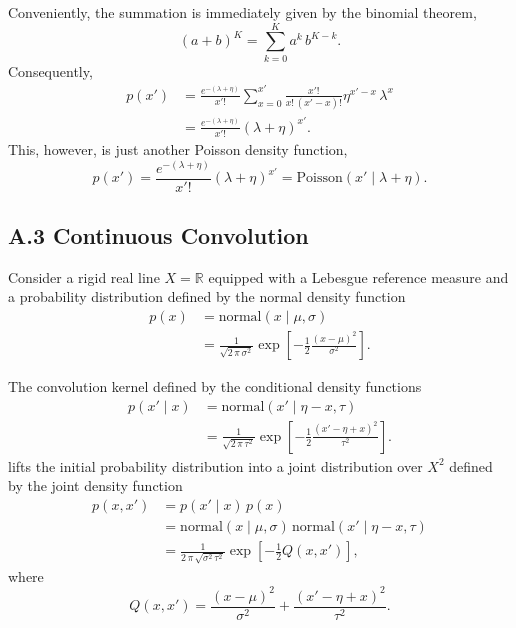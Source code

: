 \documentclass[
  letterpaper,
  DIV=11,
  numbers=noendperiod]{scrartcl}
\begin{document}
Conveniently, the summation is immediately given by the binomial
theorem, \[
( a + b )^{K} = \sum_{k = 0}^{K} a^{k} \, b^{K - k}.
\] Consequently, \begin{align*}
p ( x' )
&=
\frac{ e^{-(\lambda + \eta)} }{ x'! }
\sum_{x = 0}^{ x' }
\frac{ x'! }{ x! \, (x' - x)! }
\eta^{x' - x} \, \lambda^{x}
\\
&=
\frac{ e^{-(\lambda + \eta)} }{ x'! }
(\lambda + \eta)^{x'}.
\end{align*} This, however, is just another Poisson density function, \[
p ( x' )
=
\frac{ e^{-(\lambda + \eta)} }{ x'! }
(\lambda + \eta)^{x'}
=
\text{Poisson}( x' \mid \lambda + \eta ).
\]

\subsection*{A.3 Continuous Convolution}\label{sec:app3}

Consider a rigid real line \(X = \mathbb{R}\) equipped with a Lebesgue
reference measure and a probability distribution defined by the normal
density function \begin{align*}
p( x )
&=
\text{normal} ( x \mid \mu, \sigma )
\\
&=
\frac{1}{ \sqrt{ 2 \, \pi \, \sigma^{2} } }
\exp \left[
  -\frac{1}{2} \frac{ ( x - \mu )^{2} }{ \sigma^{2} }
\right].
\end{align*}

The convolution kernel defined by the conditional density functions
\begin{align*}
p( x' \mid x )
&=
\text{normal} ( x' \mid \eta - x, \tau )
\\
&=
\frac{1}{ \sqrt{ 2 \, \pi \, \tau^{2} } }
\exp \left[
  -\frac{1}{2} \frac{ ( x' - \eta + x )^{2} }{ \tau^{2} }
\right].
\end{align*} lifts the initial probability distribution into a joint
distribution over \(X^{2}\) defined by the joint density function
\begin{align*}
p( x, x' )
&=
p( x' \mid x ) \, p( x )
\\
&=
\text{normal} ( x \mid \mu, \sigma ) \,
\text{normal} ( x' \mid \eta - x, \tau )
\\
&=
\frac{1}{ 2 \, \pi \, \sqrt{ \sigma^{2} \, \tau^{2} } }
\exp \left[
  -\frac{1}{2} Q(x, x')
\right],
\end{align*} where \[
Q(x, x')
=
  \frac{ ( x - \mu )^{2} }{ \sigma^{2} }
+ \frac{ ( x' - \eta + x )^{2} }{ \tau^{2} }.
\]
\end{document}
